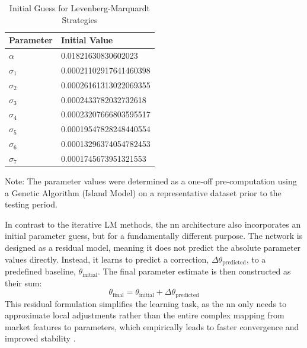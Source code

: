 \begin{table}[H]
	\centering
	\begin{threeparttable}
		\caption{Initial Guess for Levenberg-Marquardt Strategies}
		\label{tab:initial_guess}
		\begin{tabular}{ll}
			\toprule
			Parameter  & Initial Value          \\
			\midrule
			$\alpha$   & 0.01821630830602023    \\
			\addlinespace
			$\sigma_1$ & 0.00021102917641460398 \\
			$\sigma_2$ & 0.00026161313022069355 \\
			$\sigma_3$ & 0.0002433782032732618  \\
			$\sigma_4$ & 0.00023207666803595517 \\
			$\sigma_5$ & 0.00019547828248440554 \\
			$\sigma_6$ & 0.00013296374054782453 \\
			$\sigma_7$ & 0.0001745673951321553  \\
			\bottomrule
		\end{tabular}
		\begin{tablenotes}
			\item \footnotesize Note: The parameter values were determined as a one-off pre-computation using a Genetic Algorithm (Island Model) on a representative dataset prior to the testing period.
		\end{tablenotes}
	\end{threeparttable}
\end{table}

In contrast to the iterative LM methods, the \ac{nn} architecture also incorporates an initial parameter guess, but for a fundamentally different purpose. The network is designed as a residual model, meaning it does not predict the absolute parameter values directly. Instead, it learns to predict a correction, $\Delta \theta_{\text{predicted}}$, to a predefined baseline, $\theta_{\text{initial}}$. The final parameter estimate is then constructed as their sum:
\begin{equation}
	\theta_{\text{final}} = \theta_{\text{initial}} + \Delta \theta_{\text{predicted}}
\end{equation}
This residual formulation simplifies the learning task, as the \ac{nn} only needs to approximate local adjustments rather than the entire complex mapping from market features to parameters, which empirically leads to faster convergence and improved stability \parencite{he2015deepresiduallearningimage}.

